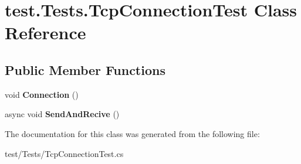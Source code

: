 \hypertarget{classtest_1_1Tests_1_1TcpConnectionTest}{}\section{test.\+Tests.\+Tcp\+Connection\+Test Class Reference}
\label{classtest_1_1Tests_1_1TcpConnectionTest}
\subsection*{Public Member Functions}
\begin{DoxyCompactItemize}
\item 
\hypertarget{classtest_1_1Tests_1_1TcpConnectionTest_a1473305d73c6617d42be5467a85bc394}{}void {\bfseries Connection} ()\label{classtest_1_1Tests_1_1TcpConnectionTest_a1473305d73c6617d42be5467a85bc394}

\item 
\hypertarget{classtest_1_1Tests_1_1TcpConnectionTest_a4b32b09bb1c091d8594c64af35f64c49}{}async void {\bfseries Send\+And\+Recive} ()\label{classtest_1_1Tests_1_1TcpConnectionTest_a4b32b09bb1c091d8594c64af35f64c49}

\end{DoxyCompactItemize}


The documentation for this class was generated from the following file\+:\begin{DoxyCompactItemize}
\item 
test/\+Tests/Tcp\+Connection\+Test.\+cs\end{DoxyCompactItemize}

